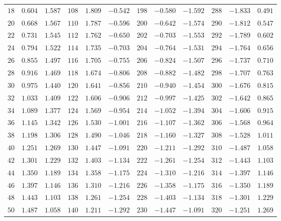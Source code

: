 \begin{table}[!h]
{\begin{tabular}{rrr|rrr|rrr|rrr}
 $18$ &  $0.604$ &  $1.587$ & $108$ &  $1.809$ & $-0.542$ & $198$ & $-0.580$ & $-1.592$ & $288$ & $-1.833$ &  $0.491$\\
 $20$ &  $0.668$ &  $1.567$ & $110$ &  $1.787$ & $-0.596$& $200$ & $-0.642$ & $-1.574$ & $290$ & $-1.812$ &  $0.547$\\
 $22$ &  $0.731$ &  $1.545$ & $112$ &  $1.762$ & $-0.650$ & $202$ & $-0.703$ & $-1.553$ & $292$ & $-1.789$ &  $0.602$\\
 $24$ &  $0.794$ &  $1.522$ & $114$ &  $1.735$ & $-0.703$ & $204$ & $-0.764$ & $-1.531$ & $294$ & $-1.764$ &  $0.656$\\
 $26$ &  $0.855$ &  $1.497$ & $116$ &  $1.705$ & $-0.755$ & $206$ & $-0.824$ & $-1.507$ & $296$ & $-1.737$ &  $0.710$\\
 $28$ &  $0.916$ &  $1.469$ & $118$ &  $1.674$ & $-0.806$ & $208$ & $-0.882$ & $-1.482$ & $298$ & $-1.707$ &  $0.763$\\
 $30$ &  $0.975$ &  $1.440$ & $120$ &  $1.641$ & $-0.856$ & $210$ & $-0.940$ & $-1.454$ & $300$ & $-1.676$ &  $0.815$\\
 $32$ &  $1.033$ &  $1.409$ & $122$ &  $1.606$ & $-0.906$ & $212$ & $-0.997$ & $-1.425$ & $302$ & $-1.642$ &  $0.865$\\
 $34$ &  $1.089$ &  $1.377$ & $124$ &  $1.569$ & $-0.954$ & $214$ & $-1.052$ & $-1.394$ & $304$ & $-1.606$ &  $0.915$\\
 $36$ &  $1.145$ &  $1.342$ & $126$ &  $1.530$ & $-1.001$ & $216$ & $-1.107$ & $-1.362$ & $306$ & $-1.568$ &  $0.964$\\
 $38$ &  $1.198$ &  $1.306$ & $128$ &  $1.490$ & $-1.046$ & $218$ & $-1.160$ & $-1.327$ & $308$ & $-1.528$ &  $1.011$\\
 $40$ &  $1.251$ &  $1.269$ & $130$ &  $1.447$ & $-1.091$ & $220$ & $-1.211$ & $-1.292$ & $310$ & $-1.487$ &  $1.058$\\
 $42$ &  $1.301$ &  $1.229$ & $132$ &  $1.403$ & $-1.134$ & $222$ & $-1.261$ & $-1.254$ & $312$ & $-1.443$ &  $1.103$\\
 $44$ &  $1.350$ &  $1.189$ & $134$ &  $1.358$ & $-1.175$ & $224$ & $-1.310$ & $-1.216$ & $314$ & $-1.397$ &  $1.146$\\
 $46$ &  $1.397$ &  $1.146$ & $136$ &  $1.310$ & $-1.216$ & $226$ & $-1.358$ & $-1.175$ & $316$ & $-1.350$ &  $1.189$\\
 $48$ &  $1.443$ &  $1.103$ & $138$ &  $1.261$ & $-1.254$ & $228$ & $-1.403$ & $-1.134$ & $318$ & $-1.301$ &  $1.229$\\
 $50$ &  $1.487$ &  $1.058$ & $140$ &  $1.211$ & $-1.292$ & $230$ & $-1.447$ & $-1.091$ & $320$ & $-1.251$ &  $1.269$\\

\end{tabular}}
\end{table}
